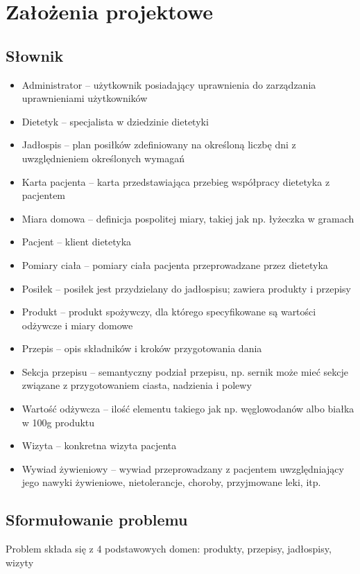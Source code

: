 \chapter{Założenia projektowe}

\section{Słownik}
\begin{itemize}
    \item Administrator – użytkownik posiadający uprawnienia do zarządzania uprawnieniami użytkowników
    \item Dietetyk – specjalista w dziedzinie dietetyki
    \item Jadłospis – plan posiłków zdefiniowany na określoną liczbę dni z uwzględnieniem określonych wymagań
    \item Karta pacjenta – karta przedstawiająca przebieg współpracy dietetyka z pacjentem
    \item Miara domowa – definicja pospolitej miary, takiej jak np. łyżeczka w gramach
    \item Pacjent – klient dietetyka
    \item Pomiary ciała – pomiary ciała pacjenta przeprowadzane przez dietetyka
    \item Posiłek – posiłek jest przydzielany do jadłospisu; zawiera produkty i przepisy
    \item Produkt – produkt spożywczy, dla którego specyfikowane są wartości odżywcze i miary domowe
    \item Przepis – opis składników i kroków przygotowania dania
    \item Sekcja przepisu – semantyczny podział przepisu, np. sernik może mieć sekcje związane z przygotowaniem ciasta, nadzienia i polewy
    \item Wartość odżywcza – ilość elementu takiego jak np. węglowodanów albo białka w 100g produktu
    \item Wizyta – konkretna wizyta pacjenta
    \item Wywiad żywieniowy – wywiad przeprowadzany z pacjentem uwzględniający jego nawyki żywieniowe, nietolerancje, choroby, przyjmowane leki, itp.
\end{itemize}

\section{Sformułowanie problemu}
Problem składa się z 4 podstawowych domen: produkty, przepisy, jadłospisy, wizyty

